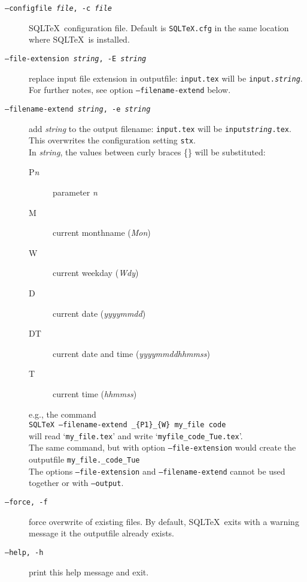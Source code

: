 \documentclass{article}
\begin{document}
\begin{description}
\item[\texttt{--configfile \textit{file}, -c \textit{file}}] SQL\TeX\ configuration file. Default is \texttt{SQLTeX.cfg}
in the same location where SQL\TeX\ is installed.

\item[\texttt{--file-extension \textit{string}, -E \textit{string}}] replace input file extension in outputfile:
\texttt{input.tex} will be \texttt{input.\textit{string}}. \\
For further notes, see option \texttt{--filename-extend} below.

\item[\texttt{--filename-extend \textit{string}, -e \textit{string}}] add \textit{string} to the output filename:
\texttt{input.tex} will be \texttt{input\textit{string}.tex}. This overwrites
the configuration setting \texttt{stx}. \\
In \textit{string}, the values between curly braces \{\} will be substituted:
\begin{description}
\item[P\textit{n}] parameter \textit{n}
\item[M] current monthname (\textit{Mon})
\item[W] current weekday (\textit{Wdy})
\item[D] current date (\textit{yyyymmdd})
\item[DT] current date and time (\textit{yyyymmddhhmmss})
\item[T] current time (\textit{hhmmss})
\end{description}
e.g., the command\\
\hspace*{1em}\texttt{SQLTeX --filename-extend \_\{P1\}\_\{W\} my\_file code}\\
will read `\texttt{my\_file.tex}' and write `\texttt{myfile\_code\_Tue.tex}'.\\
The same command, but with option \texttt{---file-extension} would create the outputfile \texttt{my\_file.\_code\_Tue}\\
The options \texttt{--file-extension} and \texttt{--filename-extend} cannot be used together or with \texttt{--output}.

\item[\texttt{--force, -f}] force overwrite of existing files. By default, SQL\TeX\ exits with a
warning message it the outputfile already exists.

\item[\texttt{--help, -h}] print this help message and exit.


\end{description}
\end{document}
